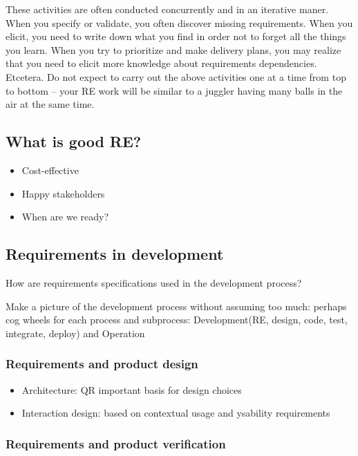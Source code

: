 These activities are often conducted concurrently and in an iterative maner. When you specify or validate, you often discover missing requirements. When you elicit, you need to write down what you find in order not to forget all the things you learn. When you try to prioritize and make delivery plans, you may realize that you need to elicit more knowledge about requirements dependencies. Etcetera. Do not expect to carry out the above activities one at a time from top to bottom -- your RE work will be similar to a juggler having many balls in the air at the same time.

\MarginPage{

}%

\subsection{What is good RE?}

\begin{itemize}
  \item Cost-effective
  \item Happy stakeholders
  \item When are we ready?
\end{itemize}

\subsection{Requirements in development}
How are requirements specifications used in the development process?

\TODO Make a picture of the development process without assuming too much: perhaps cog wheels for each process and subprocess: Development(RE, design, code, test, integrate, deploy) and Operation 

\subsubsection{Requirements and product design}

\begin{itemize}
  \item Architecture: QR important basis for design choices
  \item Interaction design: based on contextual usage and ysability requirements
\end{itemize}


\subsubsection{Requirements and product verification}

